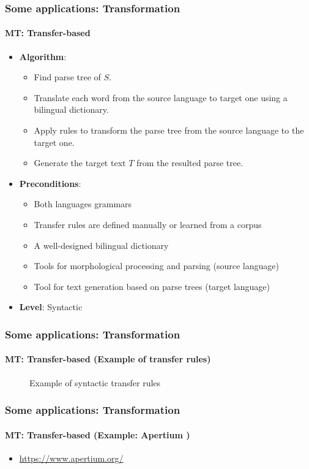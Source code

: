 \documentclass[xcolor=table]{beamer}
\begin{document}
\begin{frame}
	\frametitle{Some applications: Transformation}
	\framesubtitle{MT: Transfer-based}
	\begin{itemize}
		\item \textbf{Algorithm}:
		\begin{itemize}
			\item Find parse tree of $S$.
			\item Translate each word from the source language to target one using a bilingual dictionary.
			\item Apply rules to transform the parse tree from the source language to the target one.
			\item Generate the target text $T$ from the resulted parse tree.
		\end{itemize}
		\item \textbf{Preconditions}:
		\begin{itemize}
			\item Both languages grammars
			\item Transfer rules are defined manually or learned from a corpus
			\item A well-designed bilingual dictionary
			\item Tools for morphological processing and parsing (source language)
			\item Tool for text generation based on parse trees (target language)
		\end{itemize}
		\item \textbf{Level}: Syntactic
	\end{itemize}
\end{frame}

\begin{frame}
	\frametitle{Some applications: Transformation}
	\framesubtitle{MT: Transfer-based (Example of transfer rules)}

	\begin{figure}
		\centering
		\caption{Example of syntactic transfer rules \cite{06-quah}}
	\end{figure}

\end{frame}

\begin{frame}
	\frametitle{Some applications: Transformation}
	\framesubtitle{MT: Transfer-based (Example: Apertium \cite{11-forcada-al})}
	
	\begin{itemize}
		\item \url{https://www.apertium.org/}
	\end{itemize}

\end{frame}
\end{document}
